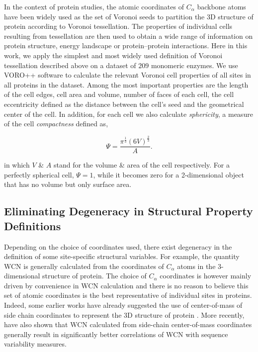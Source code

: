\documentclass[11pt]{article}
\begin{document}
        In the context of protein studies, the atomic coordinates of $C_\alpha$ backbone atoms have been widely used as the set of Voronoi seeds to partition the 3D structure of protein according to Voronoi tessellation. The properties of individual cells resulting from tessellation are then used to obtain a wide range of information on protein structure, energy landscape or protein--protein interactions. Here in this work, we apply the simplest and most widely used definition of Voronoi tessellation described above on a dataset of $209$  monomeric enzymes. We use VORO++ software \citep[][]{rycroft_voro++:_2009} to calculate the relevant Voronoi cell properties of all sites in all proteins in the dataset. Among the most important properties are the length of the cell edges, cell area and volume, number of faces of each cell, the cell eccentricity defined as the distance between the cell's seed and the geometrical center of the cell. In addition, for each cell we also calculate {\it sphericity}, a measure of the cell {\it compactness} defined as,

        \begin{equation}
        \label{eqn:sphericity}
        \Psi = \frac{\pi^{\frac{1}{3}}(6V)^{\frac{2}{3}}}{A}.
        \end{equation}

        in which $V$ \& $A$ stand for the volume \& area of the cell respectively. For a perfectly spherical cell, $\Psi=1$, while it becomes zero for a 2-dimensional object that has no volume but only surface area.

    \subsection*{Eliminating Degeneracy in Structural Property Definitions}

        Depending on the choice of coordinates used, there exist degeneracy in the definition of some site-specific structural variables. For example, the quantity WCN is generally calculated from the coordinates of $C_\alpha$ atoms in the 3-dimensional structure of protein. The choice of $C_\alpha$ coordinates is however mainly driven by convenience in WCN calculation and there is no reason to believe this set of atomic coordinates is the best representative of individual sites in proteins. Indeed, some earlier works have already suggested the use of center-of-mass of side chain coordinates to represent the 3D structure of protein \citep[e.g., ][]{soyer_voronoi_2000}. More recently, \citet{marcos_too_2014} have also shown that WCN calculated from side-chain center-of-mass coordinates generally result in significantly better correlations of WCN with sequence variability measures.\\
\end{document}
